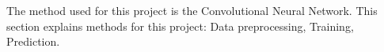 The method used for this project is the Convolutional Neural Network.
This section explains methods for this project: Data preprocessing,
Training, Prediction.
